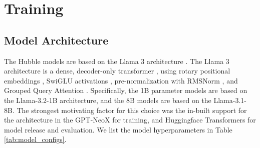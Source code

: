 \documentclass{article} %
\begin{document}
\newpage
\section{Training}
\label{app:training_details}

\subsection{Model Architecture}

The Hubble models are based on the Llama 3 architecture \citep{grattafiori2024llama3herdmodels}. The Llama 3 architecture is a dense, decoder-only transformer \citep{vaswani_transformers_2017}, using rotary positional embeddings \citep[RoPE][]{su_2024_roformer}, SwiGLU activations \citep{shazeer2020gluvariantsimprovetransformer}, pre-normalization with RMSNorm \citep{zhang_2019_layer}, and Grouped Query Attention \citep[GQA;][]{ainslie-etal-2023-gqa}. Specifically, the 1B parameter models are based on the Llama-3.2-1B architecture, and the 8B models are based on the Llama-3.1-8B. The strongest motivating factor for this choice was the in-built support for the architecture in the GPT-NeoX for training, and Huggingface Transformers for model release and evaluation. We list the model hyperparameters in Table \ref{tab:model_configs}.
\end{document}
